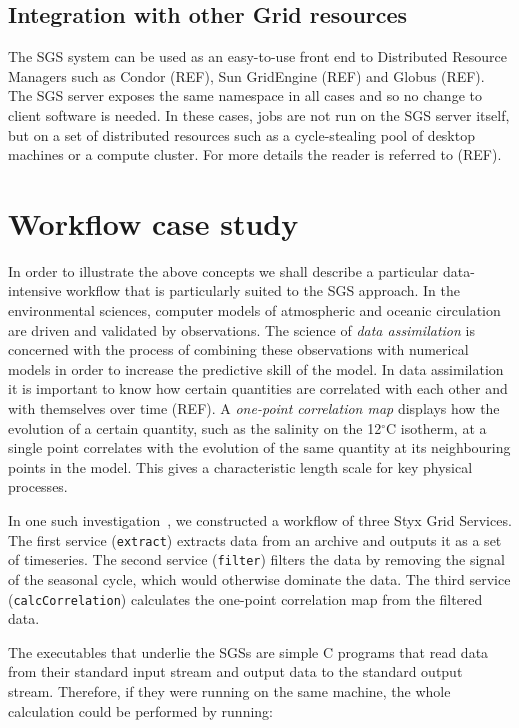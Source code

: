 \documentclass[a4paper]{article}
\begin{document}
\subsection{Integration with other Grid resources}
The SGS system can be used as an easy-to-use front end to Distributed Resource Managers such as Condor (REF), Sun GridEngine (REF) and Globus (REF).  The SGS server exposes the same namespace in all cases and so no change to client software is needed.  In these cases, jobs are not run on the SGS server itself, but on a set of distributed resources such as a cycle-stealing pool of desktop machines or a compute cluster.  For more details the reader is referred to (REF).

\section{Workflow case study}
In order to illustrate the above concepts we shall describe a particular data-intensive workflow that is particularly suited to the SGS approach.  In the environmental sciences, computer models of atmospheric and oceanic circulation are driven and validated by observations.  The science of \textit{data assimilation} is concerned with the process of combining these observations with numerical models in order to increase the predictive skill of the model.  In data assimilation it is important to know how certain quantities are correlated with each other and with themselves over time (REF).  A \textit{one-point correlation map} displays how the evolution of a certain quantity, such as the salinity on the 12$^\circ$C isotherm, at a single point correlates with the evolution of the same quantity at its neighbouring points in the model.  This gives a characteristic length scale for key physical processes.

In one such investigation~\cite{haines:2006}, we constructed a workflow of three Styx Grid Services.  The first service (\texttt{extract}) extracts data from an archive and outputs it as a set of timeseries.  The second service (\texttt{filter}) filters the data by removing the signal of the seasonal cycle, which would otherwise dominate the data.  The third service (\texttt{calcCorrelation}) calculates the one-point correlation map from the filtered data.

The executables that underlie the SGSs are simple C programs that read data from their standard input stream and output data to the standard output stream.  Therefore, if they were running on the same machine, the whole calculation could be performed by running:
\end{document}
